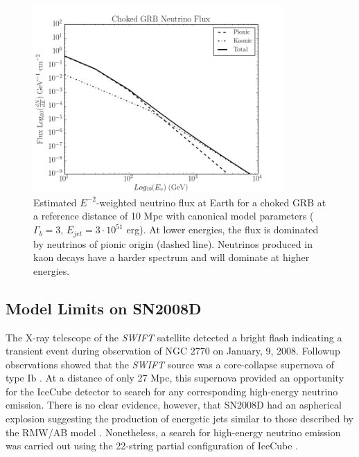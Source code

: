 \documentclass{gatech-thesis}
\begin{document}
\begin{figure}[ht]
  \begin{center}
    \includegraphics[width=0.85\textwidth,keepaspectratio]{FluxPlot_Canonical_RespectiveFluenceNorm.png}
  \end{center}
  \caption{Estimated $E^{-2}$-weighted neutrino flux at Earth for a choked GRB at a reference distance of 10 Mpc with canonical model parameters ($\Gamma_{b}=3$, $E_{jet}=3\cdot 10^{51}$ erg). At lower energies, the flux is dominated by neutrinos of pionic origin (dashed line). Neutrinos produced in kaon decays have a harder spectrum and will dominate at higher energies.}
  \label{fig:ref_chkgrb_flux}
\end{figure}

\subsection{Model Limits on SN2008D}
The X-ray telescope of the \textit{SWIFT} satellite detected a bright flash indicating a transient event during observation of NGC 2770 on January, 9, 2008. Followup observations showed that the \textit{SWIFT} source was a core-collapse supernova of type Ib \cite{2008Natur.453..469S}. At a distance of only 27 Mpc, this supernova provided an opportunity for the IceCube detector to search for any corresponding high-energy neutrino emission. There is no clear evidence, however, that SN2008D had an aspherical explosion suggesting the production of energetic jets similar to those described by the RMW/AB model \cite{2008Natur.453..469S}. Nonetheless, a search for high-energy neutrino emission was carried out using the 22-string partial configuration of IceCube \cite{2011A&A...527A..28I}.
\end{document}
